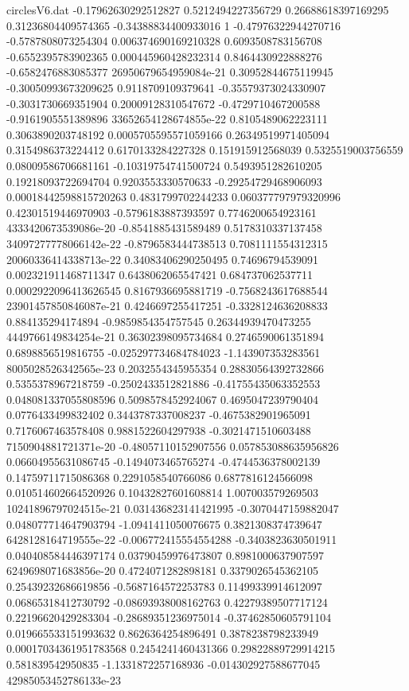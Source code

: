 \begin{filecontents}{circlesV6.dat}
-0.17962630292512827	0.5212494227356729	0.26688618397169295
0.31236804409574365	-0.34388834400933016	1
-0.47976322944270716	-0.5787808073254304	0.006374690169210328
0.6093508783156708	-0.6552395783902365	0.000445960428232314
0.8464430922888276	-0.6582476883085377	26950679654959084e-21
0.30952844675119945	-0.30050993673209625	0.9118709109379641
-0.35579373024330907	-0.3031730669351904	0.20009128310547672
-0.4729710467200588	-0.9161905551389896	33652654128674855e-22
0.8105489062223111	0.3063890203748192	0.0005705595571059166
0.26349519971405094	0.3154986373224412	0.6170133284227328
0.151915912568039	0.5325519003756559	0.08009586706681161
-0.10319754741500724	0.5493951282610205	0.19218093722694704
0.9203553330570633	-0.29254729468906093	0.00018442598815720263
0.4831799702244233	0.060377797979320996	0.42301519446970903
-0.5796183887393597	0.7746200654923161	4333420673539086e-20
-0.8541885431589489	0.5178310337137458	34097277778066142e-22
-0.8796583444738513	0.7081111554312315	20060336414338713e-22
0.34083406290250495	0.74696794539091	0.002321911468711347
0.6438062065547421	0.684737062537711	0.0002922096413626545
0.8167936695881719	-0.7568243617688544	23901457850846087e-21
0.4246697255417251	-0.3328124636208833	0.884135294174894
-0.9859854354757545	0.26344939470473255	4449766149834254e-21
0.36302398095734684	0.2746590061351894	0.6898856519816755
-0.025297734684784023	-1.143907353283561	8005028526342565e-23
0.2032554345955354	0.28830564392732866	0.5355378967218759
-0.2502433512821886	-0.41755435063352553	0.048081337055808596
0.5098578452924067	0.4695047239790404	0.0776433499832402
0.3443787337008237	-0.4675382901965091	0.7176067463578408
0.9881522604297938	-0.3021471510603488	7150904881721371e-20
-0.48057110152907556	0.057853088635956826	0.06604955631086745
-0.1494073465765274	-0.4744536378002139	0.14759711715086368
0.2291058540766086	0.6877816124566098	0.010514602664520926
0.10432827601608814	1.007003579269503	10241896797024515e-21
0.031436823141421995	-0.3070447159882047	0.048077714647903794
-1.0941411050076675	0.3821308374739647	6428128164719555e-22
-0.006772415554554288	-0.3403823630501911	0.040408584446397174
0.03790459976473807	0.8981000637907597	6249698071683856e-20
0.4724071282898181	0.3379026545362105	0.25439232686619856
-0.5687164572253783	0.11499339914612097	0.06865318412730792
-0.08693938008162763	0.42279389507717124	0.22196620429283304
-0.28689351236975014	-0.37462850605791104	0.019665533151993632
0.8626364254896491	0.3878238798233949	0.00017034361951783568
0.2454241460431366	0.29822889729914215	0.581839542950835
-1.1331872257168936	-0.014302927588677045	42985053452786133e-23

\end{filecontents}
